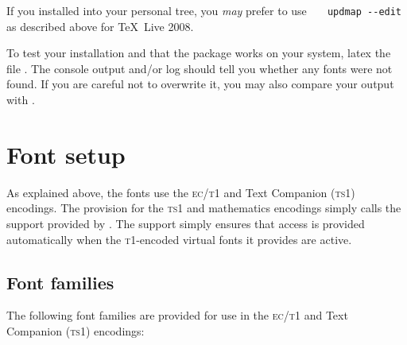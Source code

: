 \documentclass[11pt,british,a4paper]{article}
\begin{document}
If you installed into your personal tree, you \emph{may} prefer to use \verb|	updmap --edit| as described above for \TeX~Live 2008.

To test your installation and that the package works on your system, latex the file . The console output and/or log should tell you whether any fonts were not found. If you are careful not to overwrite it, you may also compare your output with .

\section{Font setup}

As explained above, the fonts use the \textsc{ec}/\textsc{t1} and Text Companion (\textsc{ts1}) encodings. The provision for the \textsc{ts1} and mathematics encodings simply calls the support provided by . The  support simply ensures that access is provided automatically when the \textsc{t1}-encoded virtual fonts it provides are active.

\subsection{Font families}

The following font families are provided for use in the \textsc{ec}/\textsc{t1} and Text Companion (\textsc{ts1}) encodings:
\end{document}
